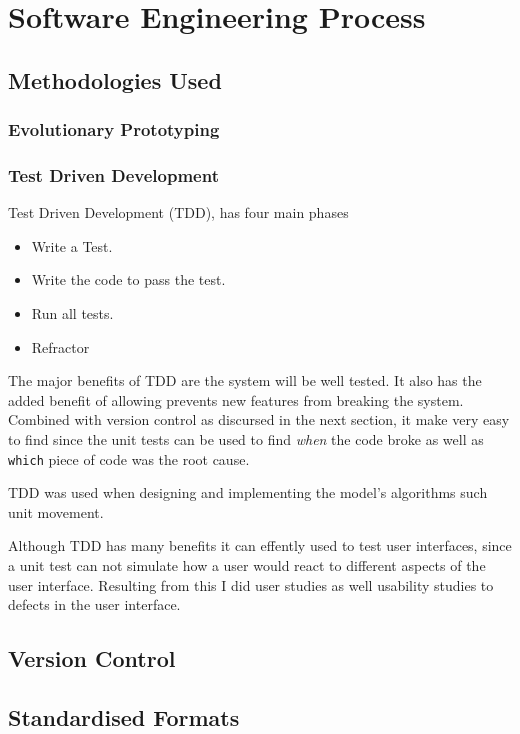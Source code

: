 \section{Software Engineering Process}

\subsection{Methodologies Used}
\label{sub:methodologies_used}

\subsubsection{Evolutionary Prototyping}
\label{ssub:evolutionary_prototyping}



\subsubsection{Test Driven Development}
Test Driven Development (TDD), has four main phases
\begin{itemize}[noitemsep ]
	\item Write a Test.
	\item Write the code to pass the test.
	\item Run all tests.
	\item Refractor
\end{itemize}

The major benefits of TDD are the system will be well tested. It also has the added benefit of allowing prevents new features from breaking the system. Combined with version control as discursed in the next section, it make very easy to find since the unit tests can be used to find \emph{when} the code broke as well as \texttt{which} piece of code was the root cause.

TDD was used when designing and implementing the model's algorithms such unit movement. 
  
Although TDD has many benefits it can effently used to test user interfaces, since a unit test can not simulate how a user would react to different aspects of the user interface.  Resulting from this I  did user studies as well usability studies to defects in the user interface.        

\subsection{Version Control}
\label{sub:version_control}

\subsection{Standardised Formats }

